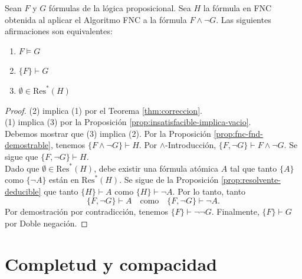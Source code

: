 \documentclass[12pt,a4paper]{book}
\begin{document}
    \begin{teorema}\label{thm:completitud-finita}
        Sean $F$ y $G$ fórmulas de la lógica proposicional. Sea $H$ la fórmula en FNC obtenida al aplicar el Algoritmo FNC a
        la fórmula $F\wedge\neg G$. Las siguientes afirmaciones son equivalentes:
        \begin{enumerate}
            \item[1.] $F\models G$
            \item[2.] $\{F\}\vdash G$
            \item[3.] $\emptyset\in\mathrm{Res}^{*}(H)$
        \end{enumerate}
    \end{teorema}
    \begin{proof}
        (2) implica (1) por el Teorema \ref{thm:correccion}.\\
        (1) implica (3) por la Proposición \ref{prop:insatisfacible-implica-vacio}.\\
        Debemos mostrar que (3) implica (2). Por la Proposición \ref{prop:fnc-fnd-demostrable}, tenemos
        $\{F\wedge\neg G\}\vdash H$. Por $\wedge$-Introducción, $\{F,\neg G\}\vdash F\wedge\neg G$. Se sigue que
        $\{F,\neg G\}\vdash H$.\\
        Dado que $\emptyset\in\mathrm{Res}^{*}(H)$, debe existir una fórmula atómica $A$ tal que tanto $\{A\}$ como
        $\{\neg A\}$ están en $\mathrm{Res}^{*}(H)$. Se sigue de la Proposición \ref{prop:resolvente-deducible} que tanto
        $\{H\}\vdash A$ como $\{H\}\vdash\neg A$. Por lo tanto, tanto
        \begin{equation*}
            \{F,\neg G\}\vdash A\quad\text{como}\quad\{F,\neg G\}\vdash\neg A.
        \end{equation*}
        Por demostración por contradicción, tenemos $\{F\}\vdash\neg\neg G$. Finalmente, $\{F\}\vdash G$ por Doble negación.
    \end{proof}

    \section{Completud y compacidad}
\end{document}
